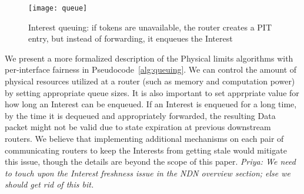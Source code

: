 \begin{figure}[htbp]
  \centering
  \texttt{[image: queue]}
  \caption{Interest queuing: if tokens are unavailable, the router creates a PIT entry, but instead of forwarding, it enqueues the Interest}
  \label{fig:queueing}
\end{figure}

We present a more formalized description of the Physical limits algorithms with per-interface fairness in Pseudocode~\ref{alg:queuing}. We can control the amount of physical resources utilized at a router (such as memory and computation power) by setting appropriate queue sizes. It is also important to set apprpriate value for how long an Interest can be enqueued. If an Interest is enqueued for a long time, by the time it is dequeued and appropriately forwarded, the resulting Data packet might not be valid due to state expiration at previous downstream routers. We believe that implementing additional mechanisms on each pair of communicating routers to keep the Interests from getting stale would mitigate this issue, though the details are beyond the scope of this paper.
{\it Priya:  We need to  touch upon the Interest freshness issue in the NDN overview section; else we should get rid of this bit.}






